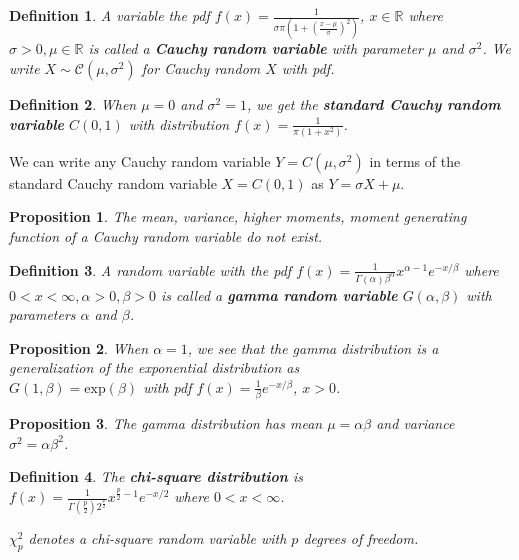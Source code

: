 \documentclass[14pt,twoside]{extreport}
\theoremstyle{dotless}
\newtheorem*{defn}{Definition}
\newtheorem*{prop}{Proposition} %
\begin{document}
\begin{defn}
    A variable the pdf $f(x) = \displaystyle \frac{1}{\sigma \pi (1 + \left( \frac{x - \mu}{\sigma} \right)^2 )}$, $x \in \mathbb{R}$ where $\sigma > 0, \mu \in \mathbb{R}$ is called a \textbf{Cauchy random variable} with parameter $\mu$ and $\sigma^2$.
    We write $X \sim \mathcal{C}(\mu, \sigma^2)$ for Cauchy random $X$ with pdf.
\end{defn}

\begin{defn}
    When $\mu = 0$ and $\sigma^2 = 1$, we get the \textbf{standard Cauchy random variable} $C(0,1)$ with distribution $f(x) = \displaystyle \frac{1}{\pi (1 + x^2)}$.
\end{defn}

We can write any Cauchy random variable $Y = C(\mu, \sigma^2)$ in terms of the standard Cauchy random variable $X = C(0,1)$ as $Y = \sigma X + \mu$.

\begin{prop}
The mean, variance, higher moments, moment generating function of a Cauchy random variable do not exist.
\end{prop}

\begin{defn}
    A random variable with the pdf $f(x) = \displaystyle  \frac{1}{\Gamma(\alpha) \beta^\alpha} x^{\alpha - 1} e^{-x/\beta}$ where $0 < x < \infty, \alpha > 0, \beta > 0$ is called a \textbf{gamma random variable} $G(\alpha, \beta)$ with parameters $\alpha$ and $\beta$.
\end{defn}
\begin{prop}
    When $\alpha=1$, we see that the gamma distribution is a generalization of the exponential distribution as \\
$G(1, \beta) = \text{exp}(\beta)$ with pdf $f(x) = \frac{1}{\beta} e^{-x/\beta}$, $x > 0$.
\end{prop}

\begin{prop}
The gamma distribution has mean $\mu = \alpha \beta$ and variance $\sigma^2 = \alpha \beta^2$.
\end{prop}

\begin{defn}
    The \textbf{chi-square distribution} is \\
    $f(x) = \displaystyle \frac{1}{\Gamma(\frac{p}{2}) 2^{\frac{p}{2}}} x^{\frac{p}{2} - 1} e ^{-x/2}$ where $0 < x < \infty$.

    \vspace{0.5cm}
    $\chi_p^2$ denotes a chi-square random variable with $p$ degrees of freedom.
\end{defn}
\end{document}
